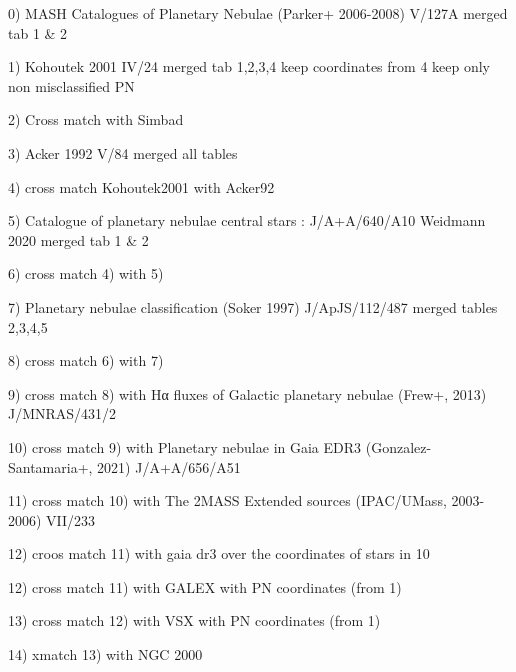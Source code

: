 0) MASH Catalogues of Planetary Nebulae (Parker+ 2006-2008) V/127A
merged tab 1 & 2

1) Kohoutek 2001 IV/24
merged tab 1,2,3,4
keep coordinates from 4
keep only non misclassified PN

2) Cross match with Simbad

3) Acker 1992 V/84
merged all tables

4) cross match Kohoutek2001 with Acker92

5) Catalogue of planetary nebulae central stars : J/A+A/640/A10 
Weidmann 2020
merged tab 1 & 2

6) cross match 4) with 5)

7) Planetary nebulae classification (Soker 1997) J/ApJS/112/487
merged tables 2,3,4,5

8) cross match 6) with 7)

9) cross match 8) with
Hα fluxes of Galactic planetary nebulae (Frew+, 2013)
J/MNRAS/431/2

10) cross match 9) with 
Planetary nebulae in Gaia EDR3 (Gonzalez-Santamaria+, 2021) 
J/A+A/656/A51

11) cross match 10) with
The 2MASS Extended sources (IPAC/UMass, 2003-2006) 
VII/233

12) croos match 11) with gaia dr3 over the coordinates of stars in 10 

12) cross match 11) with 
GALEX with PN coordinates (from 1)

13) cross match 12) with VSX
with PN coordinates (from 1)

14) xmatch 13) with NGC 2000





